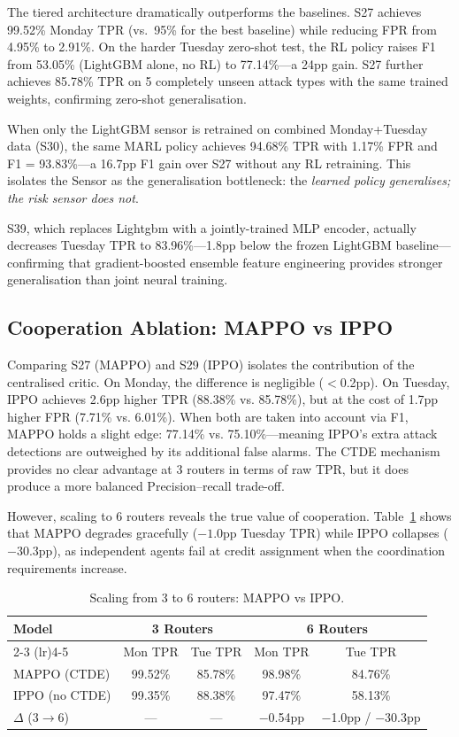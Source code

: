 \documentclass[sigconf,nonacm]{acmart}
\begin{document}
The tiered architecture dramatically outperforms the baselines. S27 achieves 99.52\% Monday TPR (vs.\ 95\% for the best baseline) while reducing FPR from 4.95\% to 2.91\%. On the harder Tuesday zero-shot test, the RL policy raises F1 from 53.05\% (LightGBM alone, no RL) to 77.14\%---a 24pp gain. S27 further achieves 85.78\% TPR on 5 completely unseen attack types with the same trained weights, confirming zero-shot generalisation.

When only the LightGBM sensor is retrained on combined Monday+Tuesday data (S30), the same MARL policy achieves 94.68\% TPR with 1.17\% FPR and F1 = 93.83\%---a 16.7pp F1 gain over S27 without any RL retraining. This isolates the Sensor as the generalisation bottleneck: the \emph{learned policy generalises; the risk sensor does not}.

S39, which replaces Lightgbm with a jointly-trained MLP encoder, actually decreases Tuesday TPR to 83.96\%---1.8pp below the frozen LightGBM baseline---confirming that gradient-boosted ensemble feature engineering provides stronger generalisation than joint neural training.

\subsection{Cooperation Ablation: MAPPO vs IPPO}

Comparing S27 (MAPPO) and S29 (IPPO) isolates the contribution of the centralised critic. On Monday, the difference is negligible ($<$0.2pp). On Tuesday, IPPO achieves 2.6pp higher TPR (88.38\% vs. 85.78\%), but at the cost of 1.7pp higher FPR (7.71\% vs. 6.01\%). When both are taken into account via F1, MAPPO holds a slight edge: 77.14\% vs. 75.10\%---meaning IPPO's extra attack detections are outweighed by its additional false alarms. The CTDE mechanism provides no clear advantage at 3 routers in terms of raw TPR, but it does produce a more balanced Precision--recall trade-off.

However, scaling to 6 routers reveals the true value of cooperation. Table~\ref{tab:scaling} shows that MAPPO degrades gracefully ($-1.0$pp Tuesday TPR) while IPPO collapses ($-30.3$pp), as independent agents fail at credit assignment when the coordination requirements increase.

\begin{table}[t]
\centering
\small
\caption{Scaling from 3 to 6 routers: MAPPO vs IPPO.}
\label{tab:scaling}
\begin{tabular}{lcccc}
\toprule
\multirow{2}{*}{Model} & \multicolumn{2}{c}{3 Routers} & \multicolumn{2}{c}{6 Routers} \\
\cmidrule(lr){2-3} \cmidrule(lr){4-5}
 & Mon TPR & Tue TPR & Mon TPR & Tue TPR \\
\midrule
MAPPO (CTDE)    & 99.52\% & 85.78\% & 98.98\% & 84.76\% \\
IPPO (no CTDE)  & 99.35\% & 88.38\% & 97.47\% & 58.13\% \\
\midrule
$\Delta$ (3$\to$6) & --- & --- & $-$0.54pp & $-$1.0pp / $-$30.3pp \\
\bottomrule
\end{tabular}
\end{table}
\end{document}
